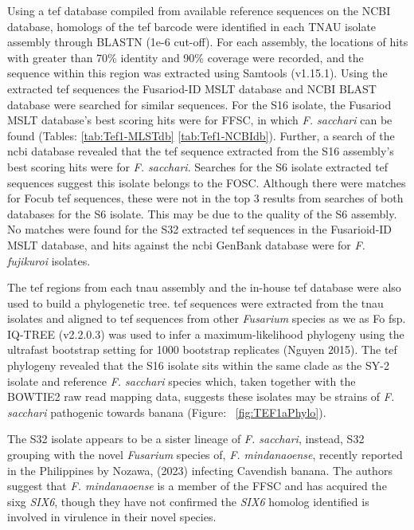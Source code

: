 Using a \ac{tef} database compiled from available reference sequences on the NCBI database, homologs of the \ac{tef} barcode were identified in each TNAU isolate assembly through BLASTN (1e-6 cut-off). For each assembly, the locations of hits with greater than 70\% identity and 90\% coverage were recorded, and the sequence within this region was extracted using Samtools (v1.15.1). Using the extracted \ac{tef} sequences the Fusariod-ID MSLT database and NCBI BLAST database were searched for similar sequences. For the S16 isolate, the Fusariod MSLT database's best scoring hits were for \ac{FFSC}, in which \textit{F. sacchari} can be found (Tables: \ref{tab:Tef1-MLSTdb} \ref{tab:Tef1-NCBIdb}). Further, a search of the \ac{ncbi} database revealed that the \ac{tef} sequence extracted from the S16 assembly's best scoring hits were for \textit{F. sacchari}. Searches for the S6 isolate extracted \ac{tef} sequences suggest this isolate belongs to the \ac{FOSC}. Although there were matches for \ac{Focub} \ac{tef} sequences, these were not in the top 3 results from searches of both databases for the S6 isolate. This may be due to the quality of the S6 assembly. No matches were found for the S32 extracted \ac{tef} sequences in the Fusarioid-ID MSLT database, and hits against the \ac{ncbi} GenBank database were for \textit{F. fujikuroi} isolates. 

\bigskip

\bigskip

The \ac{tef} regions from each \ac{tnau} assembly and the in-house \ac{tef} database were also used to build a phylogenetic tree. \Ac{tef} sequences were extracted from the \ac{tnau} isolates and aligned to \ac{tef} sequences from other \textit{Fusarium} species as we as \ac{Fo} \ac{fsp}. IQ-TREE (v2.2.0.3) was used to infer a maximum-likelihood phylogeny using the ultrafast bootstrap setting for 1000 bootstrap replicates (Nguyen 2015). The \ac{tef} phylogeny revealed that the  S16 isolate sits within the same clade as the SY-2 isolate and reference \textit{F. sacchari} species which, taken together with the BOWTIE2 raw read mapping data, suggests these isolates may be strains of \textit{F. sacchari} pathogenic towards banana (Figure: ~\ref{fig:TEF1aPhylo}). 

The S32 isolate appears to be a sister lineage of \textit{F. sacchari}, instead, S32 grouping with the novel \textit{Fusarium} species of, \textit{F. mindanaoense}, recently reported in the Philippines by Nozawa, \et (2023) infecting Cavendish banana. The authors suggest that \textit{F. mindanaoense} is a member of the \ac{FFSC} and has acquired the \ac{sixg} \textit{SIX6}, though they have not confirmed the \textit{SIX6} homolog identified is involved in virulence in their novel species.

